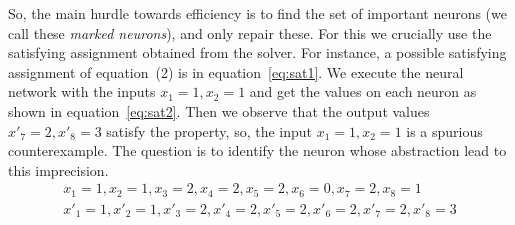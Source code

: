 So, the main hurdle towards efficiency is to find the set of important neurons (we call these {\em marked neurons}), 
and only repair these.  For this we crucially use the satisfying assignment obtained from the \milp{} solver.
For instance, a possible satisfying assignment of equation~(2)%
is in equation~\ref{eq:sat1}. We execute the neural network with the inputs $x_1=1,x_2=1$ and get the values 
on each neuron as shown in equation~\ref{eq:sat2}. 
Then we observe that the output values $x'_7=2, x'_8=3$ satisfy the property, 
so, the input $x_1=1, x_2=1$ is a spurious counterexample. 
The question is to identify the neuron whose abstraction lead to this imprecision.
\setcounter{equation}{2}
\begin{align}
  x_1=1, x_2=1, x_3=2, x_4=2, x_5=2, x_6=0, x_7=2, x_8=1 \label{eq:sat1} \\
  x'_1=1, x'_2=1, x'_3=2, x'_4=2, x'_5=2, x'_6=2, x'_7=2, x'_8=3 \label{eq:sat2}
\end{align}





